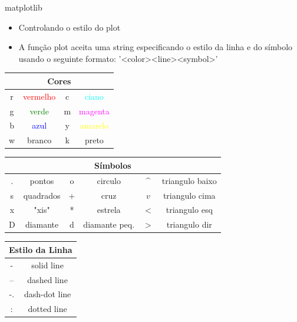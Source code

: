 \documentclass[12pt,t,graphics]{beamer}
\begin{document}
\begin{frame}[t,fragile]{matplotlib}
	\begin{itemize}
		\item Controlando o estilo do plot
		\item A função plot aceita uma string especificando o estilo da linha
		e do símbolo usando o seguinte formato: '<color><line><symbol>'
	\end{itemize}
	
	\begin{tiny}
		
		\begin{table}
			\centering
			\begin{tabular}[r]{|cc||cc|}
				\hline
				\multicolumn{4}{|c|}{Cores} \\
				\hline
				r & \textcolor{red}{vermelho} & c & \textcolor{cyan}{ciano} \\
				g & \textcolor{green}{verde}  & m & \textcolor{magenta}{magenta} \\
				b & \textcolor{blue}{azul}    & y & \textcolor{yellow}{amarelo} \\
				w & branco                    & k & preto \\
				\hline
			\end{tabular}
		\end{table}
		
		\vspace{-0.25cm}
		
		\begin{table}
			\centering
			\begin{tabular}[c]{|cc||cc||cc|}
				\hline
				\multicolumn{6}{|c|}{Símbolos} \\
				\hline
				. & pontos     & o & circulo       & \^{} & triangulo baixo \\
				s & quadrados  & + & cruz          & $v$ & triangulo cima  \\
				x & "xis"      & * & estrela       & $<$ & triangulo esq   \\
				D & diamante   & d & diamante peq. & $>$ & triangulo dir   \\
				\hline
			\end{tabular}
		\end{table}
		
		\vspace{-0.25cm}
		
		\begin{table}
			\centering
			\begin{tabular}[c]{|c||c|}
				\hline
				\multicolumn{2}{|c|}{Estilo da Linha} \\
				\hline
				-  & solid line    \\
				-- & dashed line   \\
				-. & dash-dot line \\
				:  & dotted line   \\
				\hline
			\end{tabular}
		\end{table}
	\end{tiny}
\end{frame}
\end{document}
